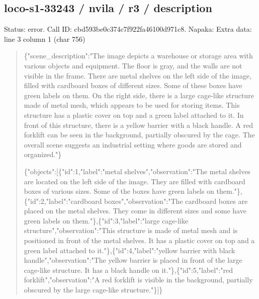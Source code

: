 \documentclass[10pt,a4paper]{article}
\begin{document}
\subsection*{loco-s1-33243 / nvila / r3 / description}
Status: error. Call ID: cbd593be0c374c7f922fa46100d971c8. Napaka: Extra data: line 3 column 1 (char 756)
\begin{quote}\footnotesize
\{"scene\_description":\allowbreak{}"The image depicts a warehouse or storage area with various objects and equipment. The floor is gray,\allowbreak{} and the walls are not visible in the frame. There are metal shelves on the left side of the image,\allowbreak{} filled with cardboard boxes of different sizes. Some of these boxes have green labels on them. On the right side,\allowbreak{} there is a large cage-like structure made of metal mesh,\allowbreak{} which appears to be used for storing items. This structure has a plastic cover on top and a green label attached to it. In front of this structure,\allowbreak{} there is a yellow barrier with a black handle. A red forklift can be seen in the background,\allowbreak{} partially obscured by the cage. The overall scene suggests an industrial setting where goods are stored and organized."\}\par
\par
\{"objects":\allowbreak{}[\{"id":\allowbreak{}1,\allowbreak{}"label":\allowbreak{}"met\allowbreak{}al shelves",\allowbreak{}"observation":\allowbreak{}"The metal shelves are located on the left side of the image. They are filled with cardboard boxes of various sizes. Some of the boxes have green labels on them."\},\allowbreak{}\{"id":\allowbreak{}2,\allowbreak{}"label":\allowbreak{}"cardboa\allowbreak{}rd boxes",\allowbreak{}"observation":\allowbreak{}"The cardboard boxes are placed on the metal shelves. They come in different sizes and some have green labels on them."\},\allowbreak{}\{"id":\allowbreak{}3,\allowbreak{}"label":\allowbreak{}"large cage-like structure",\allowbreak{}"observation":\allowbreak{}"This structure is made of metal mesh and is positioned in front of the metal shelves. It has a plastic cover on top and a green label attached to it."\},\allowbreak{}\{"id":\allowbreak{}4,\allowbreak{}"label":\allowbreak{}"yellow barrier with black handle",\allowbreak{}"observation":\allowbreak{}"The yellow barrier is placed in front of the large cage-like structure. It has a black handle on it."\},\allowbreak{}\{"id":\allowbreak{}5,\allowbreak{}"label":\allowbreak{}"red forklift",\allowbreak{}"observation":\allowbreak{}"A red forklift is visible in the background,\allowbreak{} partially obscured by the large cage-like structure."\}]\}
\end{quote}
\end{document}
